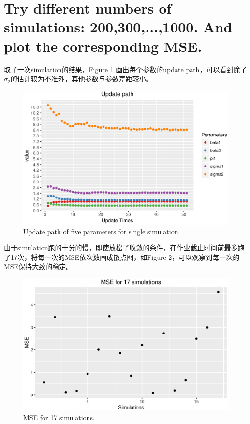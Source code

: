 \documentclass[11pt]{article}
\begin{document}
\section{Try different numbers of simulations: 200,300,...,1000. And plot the corresponding
MSE.}
取了一次simulation的结果，Figure 1 画出每个参数的update path，可以看到除了$\sigma_2$的估计较为不准外，其他参数与参数差距较小。
\begin{figure}[htbp]%
    \centering  %
    \includegraphics[scale=0.8]{update_path.eps}   
    \caption{Update path of five parameters for single simulation.}  %
    \label{update}   %
\end{figure}  



由于simulation跑的十分的慢，即使放松了收敛的条件，在作业截止时间前最多跑了17次，将每一次的MSE依次数画成散点图，如Figure 2，可以观察到每一次的MSE保持大致的稳定。

\begin{figure}[htbp]%
    \centering  %
    \includegraphics[scale=0.8]{MSE.eps}   
    \caption{MSE for 17 simulations.}  %
    \label{MSE}   %
\end{figure} 
\end{document}
